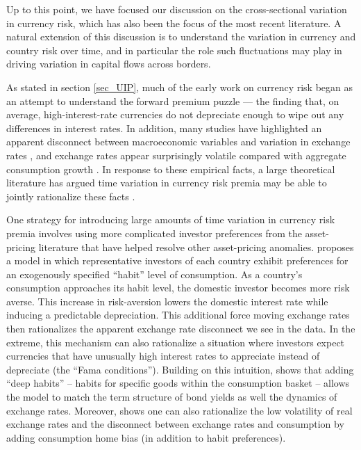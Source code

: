 \documentclass{ar-1col}
\begin{document}
Up to this point, we have focused our discussion on the cross-sectional variation in currency risk, which has also been the focus of the most recent literature. A natural extension of this discussion is to understand the variation in currency and country risk over time, and in particular the role such fluctuations may play in driving variation in capital flows across borders.

As stated in section \ref{sec_UIP}, much of the early work on currency risk began as an attempt to understand the forward premium puzzle --- the finding that, on average, high-interest-rate currencies do not depreciate enough to wipe out any differences in interest rates. In addition, many studies have highlighted an apparent disconnect between macroeconomic variables and variation in exchange rates \citep{MeeseRogoff1983}, and exchange rates appear surprisingly volatile compared with aggregate consumption growth \citep{BackusSmith1993}. In response to these empirical facts, a large theoretical literature has argued time variation in currency risk premia may be able to jointly rationalize these facts \citep{Fama1984,Backusetal2001}.

One strategy for introducing large amounts of time variation in currency risk premia involves using more complicated investor preferences from the asset-pricing literature that have helped resolve other asset-pricing anomalies. \citet{Verdelhan2010} proposes a model in which representative investors of each country exhibit preferences for an exogenously specified ``habit'' level of consumption. As a country's consumption approaches its habit level, the domestic investor becomes more risk averse. This increase in risk-aversion lowers the domestic interest rate while inducing a predictable depreciation. This additional force moving exchange rates then rationalizes the apparent exchange rate disconnect we see in the data. In the extreme, this mechanism can also rationalize a situation where investors expect currencies that have unusually high interest rates to appreciate instead of depreciate (the ``Fama conditions'').  Building on this intuition, \citet{Heyerdahl-Larsen2011} shows that adding ``deep habits'' -- habits for specific goods within the consumption basket -- allows the model to match the term structure of bond yields as well the dynamics of exchange rates. Moreover, \citet{Stathopoulos2017} shows one can also rationalize the low volatility of real exchange rates and the disconnect between exchange rates and consumption by adding consumption home bias (in addition to habit preferences). 
\end{document}
